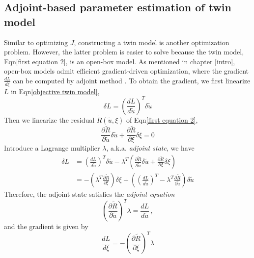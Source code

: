 \documentclass[a4paper,onecolumn]{article}
\theoremstyle{remark}
\begin{document}
\subsection{Adjoint-based parameter estimation of twin model}
\noindent Similar to optimizing $J$, constructing a twin model is another optimization problem. 
However, the latter problem is easier to solve because the twin model, Eqn\eqref{first equation 2},
is an open-box model. As mentioned in chapter \ref{intro}, open-box models admit efficient
gradient-driven optimization, where the gradient $\frac{dL}{d\xi}$
can be computed by adjoint method \cite{adjoint, cont discretize adjoint}.
To obtain the gradient, we first linearize $L$ in Eqn\eqref{objective twin model},
\begin{equation}
    \delta L = \left(\frac{d L}{d \tilde{u}}\right)^T \delta \tilde{u}
\end{equation}
Then we linearize the residual $\tilde{R}(\tilde{u},\xi)$ of Eqn\eqref{first equation 2},
\begin{equation}
    \frac{\partial \tilde{R}}{\partial \tilde{u}} \delta \tilde{u}
    + \frac{\partial \tilde{R}}{\partial \xi} \delta \xi = 0
\end{equation}
Introduce a Lagrange multiplier $\lambda$, a.k.a. \emph{adjoint state}, we have
\begin{equation}\begin{split}
    \delta L &= \left(\frac{d L}{d \tilde{u}}\right)^T \delta \tilde{u}
    - \lambda^T \left(\frac{\partial \tilde{R}}{\partial \tilde{u}} \delta \tilde{u}
    + \frac{\partial \tilde{R}}{\partial \xi}\delta \xi\right)\\
    &= -\left( \lambda^T \frac{\partial \tilde{R}}{\partial \xi}\right) \delta \xi
    + \left( \left(\frac{d L}{d \tilde{u}}\right)^T 
        - \lambda^T \frac{\partial \tilde{R}}{\partial \tilde{u}}
    \right)\delta \tilde{u}
\end{split}\end{equation}
Therefore, the adjoint state satisfies the \emph{adjoint equation}
\begin{equation}
    \left(\frac{\partial \tilde{R}}{\partial \tilde{u}}\right)^T \lambda = \frac{d L}{d\tilde{u}}\,,
\end{equation}
and the gradient is given by
\begin{equation}
    \frac{dL}{d \xi} = -
    \left(\frac{\partial \tilde{R}}{\partial \xi}\right)^T \lambda
\end{equation}
\end{document}
